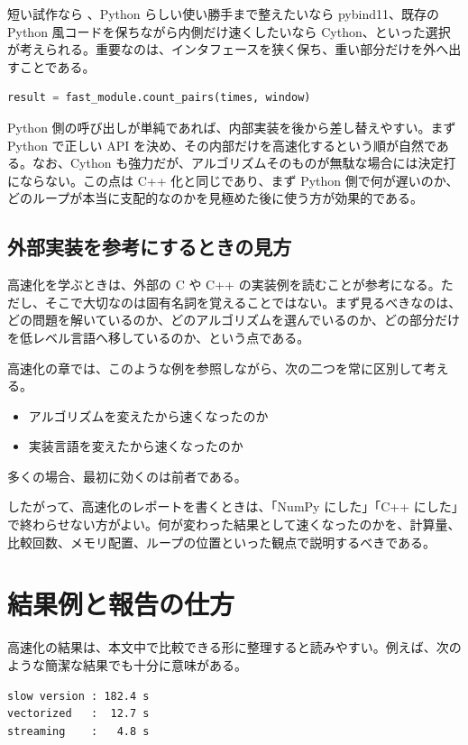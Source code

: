 短い試作なら 、Python らしい使い勝手まで整えたいなら pybind11、既存の Python 風コードを保ちながら内側だけ速くしたいなら Cython、といった選択が考えられる。重要なのは、インタフェースを狭く保ち、重い部分だけを外へ出すことである。

\begin{lstlisting}[language=Python]
result = fast_module.count_pairs(times, window)
\end{lstlisting}

Python 側の呼び出しが単純であれば、内部実装を後から差し替えやすい。まず Python で正しい API を決め、その内部だけを高速化するという順が自然である。なお、Cython も強力だが、アルゴリズムそのものが無駄な場合には決定打にならない。この点は C++ 化と同じであり、まず Python 側で何が遅いのか、どのループが本当に支配的なのかを見極めた後に使う方が効果的である。

\subsection{外部実装を参考にするときの見方}

高速化を学ぶときは、外部の C や C++ の実装例を読むことが参考になる。ただし、そこで大切なのは固有名詞を覚えることではない。まず見るべきなのは、どの問題を解いているのか、どのアルゴリズムを選んでいるのか、どの部分だけを低レベル言語へ移しているのか、という点である。

高速化の章では、このような例を参照しながら、次の二つを常に区別して考える。

\begin{itemize}
\item アルゴリズムを変えたから速くなったのか
\item 実装言語を変えたから速くなったのか
\end{itemize}

多くの場合、最初に効くのは前者である。

したがって、高速化のレポートを書くときは、「NumPy にした」「C++ にした」で終わらせない方がよい。何が変わった結果として速くなったのかを、計算量、比較回数、メモリ配置、ループの位置といった観点で説明するべきである。

\section{結果例と報告の仕方}

高速化の結果は、本文中で比較できる形に整理すると読みやすい。例えば、次のような簡潔な結果でも十分に意味がある。

\begin{lstlisting}[numbers=none, xleftmargin=2\zw]
slow version : 182.4 s
vectorized   :  12.7 s
streaming    :   4.8 s
\end{lstlisting}

